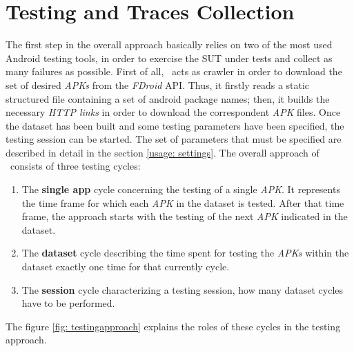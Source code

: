 \section{Testing and Traces Collection}
\label{approach:testing}
The first step in the overall approach basically relies on two of the most used Android testing tools, in order to exercise the SUT under tests and collect as many failures as possible. 
First of all, \toolname\ acts as crawler in order to download the set of desired \textit{APKs} from the \textit{FDroid} API. 
Thus, it firstly reads a static structured file containing a set of android package names; then, it builds the necessary \textit{HTTP links} in order to download the correspondent \textit{APK} files. 
Once the dataset has been built and some testing parameters have been specified, the testing session can be started. 
The set of parameters that must be specified are described in detail in the section \ref{usage: settings}.
The overall approach of \toolname\ consists of three testing cycles: 
\begin{enumerate}
\item The \textbf{single app} cycle concerning the testing of a single \textit{APK}. It represents the time frame for which each \textit{APK} in the dataset is tested. After that time frame, the approach starts with the testing of the next \textit{APK} indicated in the dataset. 
\item The \textbf{dataset} cycle describing the time spent for testing the \textit{APKs} within the dataset exactly one time for that currently cycle. 
\item The \textbf{session} cycle characterizing a testing session, \ie how many dataset cycles have to be performed. 
\end{enumerate}
The figure \ref{fig: testingapproach} explains the roles of these cycles in the testing approach. 

